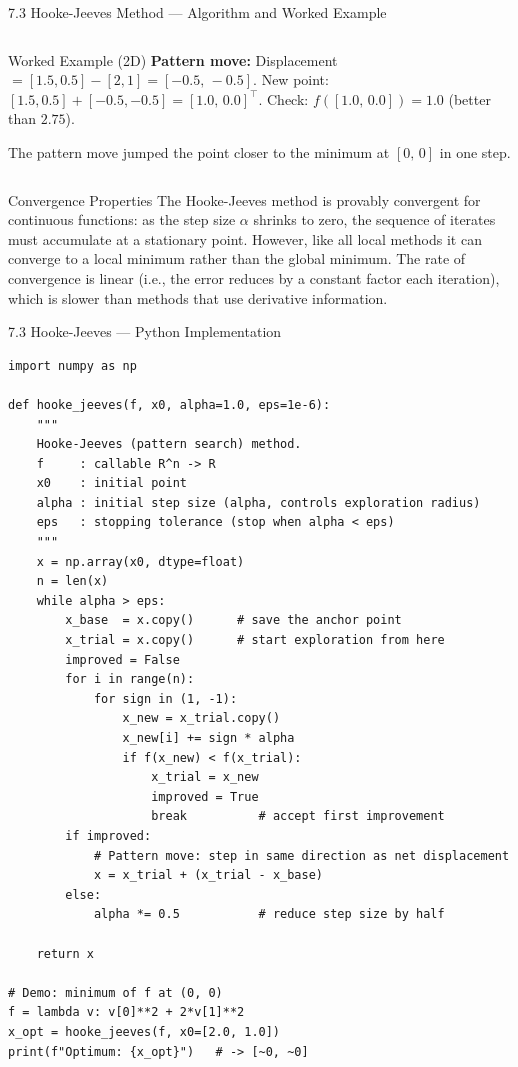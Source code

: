 \documentclass[aspectratio=169,10pt]{beamer}
\begin{document}
\begin{frame}[allowframebreaks]{7.3 Hooke-Jeeves Method --- Algorithm and Worked Example}
\begin{columns}[T]
\begin{exampleblock}{Worked Example (2D)}
        \textbf{Pattern move:}
        Displacement $= [1.5,0.5] - [2,1] = [-0.5,\,-0.5]$.
        New point: $[1.5,0.5] + [-0.5,-0.5] = [1.0,\,0.0]^\top$.
        Check: $f([1.0,\,0.0]) = 1.0$ (better than $2.75$).

        The pattern move jumped the point closer to the minimum
        at $[0,\,0]$ in one step.
      \end{exampleblock}
  \end{columns}

  \begin{block}{Convergence Properties}
    The Hooke-Jeeves method is provably convergent for continuous
    functions: as the step size $\alpha$ shrinks to zero, the
    sequence of iterates must accumulate at a stationary point.
    However, like all local methods it can converge to a local minimum
    rather than the global minimum.  The rate of convergence is
    linear (i.e., the error reduces by a constant factor each iteration),
    which is slower than methods that use derivative information.
  \end{block}
\end{frame}

\begin{frame}[fragile]{7.3 Hooke-Jeeves --- Python Implementation}
\begin{lstlisting}[style=python, caption={Hooke-Jeeves method in Python}]
import numpy as np

def hooke_jeeves(f, x0, alpha=1.0, eps=1e-6):
    """
    Hooke-Jeeves (pattern search) method.
    f     : callable R^n -> R
    x0    : initial point
    alpha : initial step size (alpha, controls exploration radius)
    eps   : stopping tolerance (stop when alpha < eps)
    """
    x = np.array(x0, dtype=float)
    n = len(x)
    while alpha > eps:
        x_base  = x.copy()      # save the anchor point
        x_trial = x.copy()      # start exploration from here
        improved = False
        for i in range(n):
            for sign in (1, -1):
                x_new = x_trial.copy()
                x_new[i] += sign * alpha
                if f(x_new) < f(x_trial):
                    x_trial = x_new
                    improved = True
                    break          # accept first improvement
        if improved:
            # Pattern move: step in same direction as net displacement
            x = x_trial + (x_trial - x_base)
        else:
            alpha *= 0.5           # reduce step size by half

    return x

# Demo: minimum of f at (0, 0)
f = lambda v: v[0]**2 + 2*v[1]**2
x_opt = hooke_jeeves(f, x0=[2.0, 1.0])
print(f"Optimum: {x_opt}")   # -> [~0, ~0]
\end{lstlisting}
\end{frame}
\end{document}
